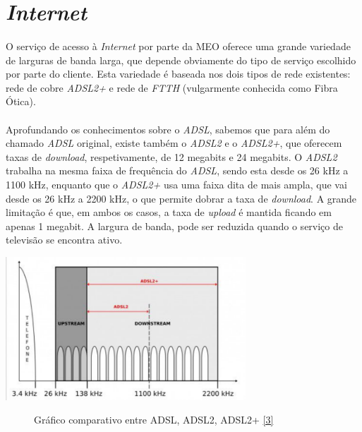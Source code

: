 \documentclass{report}
\begin{document}
\section{\textit{Internet}}

\paragraph{}O serviço de acesso à \textit{Internet} por parte da MEO oferece uma grande variedade de larguras de banda larga, que depende obviamente do tipo de serviço escolhido por parte do cliente. Esta variedade é baseada nos dois tipos de rede existentes: rede de cobre \textit{ADSL2+} e rede de \textit{FTTH} (vulgarmente conhecida como Fibra Ótica). 

\paragraph{}Aprofundando os conhecimentos sobre o \textit{ADSL}, sabemos que para além do chamado \textit{ADSL} original, existe também o \textit{ADSL2} e o \textit{ADSL2+}, que oferecem taxas de \textit{download}, respetivamente, de 12 megabits e 24 megabits. O \textit{ADSL2} trabalha na mesma faixa de frequência do \textit{ADSL}, sendo esta desde os 26 kHz a 1100 kHz, enquanto que o \textit{ADSL2+} usa uma faixa dita de mais ampla, que vai desde os 26 kHz a 2200 kHz, o que permite dobrar a taxa de \textit{download}. A grande limitação é que, em ambos os casos, a taxa de \textit{upload} é mantida ficando em apenas 1 megabit. A largura de banda, pode ser reduzida quando o serviço de televisão se encontra ativo.

\begin{center}
\includegraphics[width=9cm]{ADSL.pdf} 
\begin{figure}[h]
\caption{Gráfico comparativo entre ADSL, ADSL2, ADSL2+ \href{http://e.cdn-hardware.com.br/static/20140313/redes-adsl2re1.png.499x297.auto.jpg?CmsZoomEnable}{[3]}}
\end{figure}
\end{center}
\end{document}
